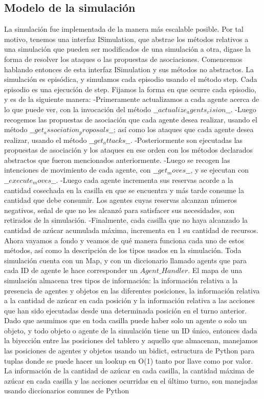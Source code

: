 \documentclass[11pt]{article}
\begin{document}
\subsection{Modelo de la simulación}
La simulación fue implementada de la manera más escalable posible. Por tal motivo, tenemos una interfaz ISimulation, que abstrae los métodos relativos a una simulación que pueden ser modificados de una simulación a otra, digase la forma de resolver los ataques o las propuestas de asociaciones. Comencemos hablando entonces de esta interfaz ISimulation y sus métodos no abstractos.
La simulación es episódica, y simulamos cada episodio usando el método step. Cada episodio es una ejecución de step. Fijamos la forma en que ocurre cada episodio, y es de la siguiente manera:
-Primeramente actualizamos a cada agente acerca de lo que puede ver, con la invocación del método $\_\_actualize_agents_vision\_\_$.
-Luego recogemos las propuestas de asociación que cada agente desea realizar, usando el método $\_\_get_association_proposals\_\_$; así como los ataques que cada agente desea realizar, usando el método $\_\_get_attacks\_\_$.
-Posteriormente son ejecutadas las propuestas de asociación y los ataques en ese orden con los métodos declarados abstractos que fueron mencionados anteriormente.
-Luego se recogen las intenciones de movimiento de cada agente, con $\_\_get_moves\_\_$, y se ejecutan con $\_\_execute_moves\_\_$.
-Luego cada agente incrementa sus reservas acorde a la cantidad cosechada en la casilla en que se encuentra y más tarde consume la cantidad que debe consumir. Los agentes cuyas reservas alcanzan números negativos, señal de que no les alcanzó para satisfacer sus necesidades, son retirados de la simulación.
-Finalmente, cada casilla que no haya alcanzado la cantidad de azúcar acumulada máxima, incrementa en 1 su cantidad de recursos.
Ahora vayamos a fondo y veamos de qué manera funciona cada uno de estos métodos, así como la descripción de los tipos usados en la simulación.
Toda simulación cuenta con un Map, y con un diccionario llamado agents que para cada ID de agente le hace corresponder un $Agent\_Handler$.
El mapa de una simulación almacena tres tipos de información: la información relativa a la presencia de agentes y objetos en las diferentes posiciones, la información relativa a la cantidad de azúcar en cada posición y la información relativa a las acciones que han sido ejecutadas desde una determinada posición en el turno anterior. Dado que asumimos que en toda casilla puede haber solo un agente o solo un objeto, y todo objeto o agente de la simulación tiene un ID único, entonces dada la biyección entre las posiciones del tablero y aquello que almacenan, manejamos las posiciones de agentes y objetos usando un bidict, estructura de Python para tuplas donde se puede hacer un lookup en O(1) tanto por llave como por valor. La información de la cantidad de azúcar en cada casilla, la cantidad máxima de azúcar en cada casilla y las acciones ocurridas en el último turno, son manejadas usando diccionarios comunes de Python
\end{document}
